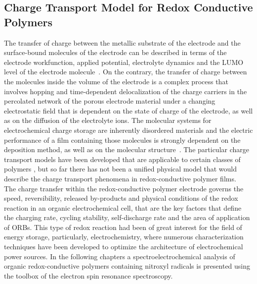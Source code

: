 \subsection{Charge Transport Model for Redox Conductive Polymers}  
The transfer of charge between the metallic substrate of the electrode and the surface-bound molecules of the electrode can be described in terms of the electrode workfunction, applied potential, electrolyte dynamics and the LUMO level of the electrode molecule~\cite{Bard_book}. 
On the contrary, the transfer of charge between the molecules inside the volume of the electrode is a complex process that involves hopping and time-dependent delocalization of the charge carriers in the percolated network of the porous electrode material under a changing electrostatic field that is dependent on the state of charge of the electrode, as well as on the diffusion of the electrolyte ions. The molecular systems for electrochemical charge storage are inherently disordered materials and the electric performance of a film containing those molecules is strongly dependent on the deposition method, as well as on the molecular structure~\cite{Xie2021}. The particular charge transport models have been developed that are applicable to certain classes of polymers , but so far there has not been a unified physical model that would describe the charge transport phenomena in redox-conductive polymer films.\\

The charge transfer within the redox-conductive polymer electrode governs the speed, reversibility, released by-products and physical conditions of the redox reaction in an organic electrochemical cell, that are the key factors that define the charging rate, cycling stability, self-discharge rate and the area of application of ORBs. This type of redox reaction had been of great interest for the field of energy storage, particularly, electrochemistry, where numerous characterization techniques have been developed to optimize the architecture of electrochemical power sources. In the following chapters a spectroelectrochemical analysis of organic redox-conductive polymers containing nitroxyl radicals is presented using the toolbox of the electron spin resonance spectroscopy.\\